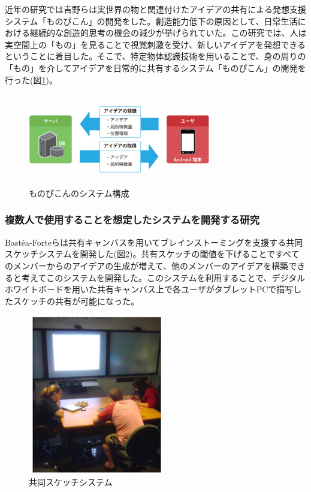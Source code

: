 \documentclass[11pt,a4j, titlepage]{jarticle} %
\begin{document}
近年の研究では吉野ら\cite{yoshino}は実世界の物と関連付けたアイデアの共有による発想支援システム「ものぴこん」の開発をした。創造能力低下の原因として、日常生活における継続的な創造的思考の機会の減少が挙げられていた。この研究では、人は実空間上の「もの」を見ることで視覚刺激を受け、新しいアイデアを発想できるということに着目した。そこで、特定物体認識技術を用いることで、身の周りの「もの」を介してアイデアを日常的に共有するシステム「ものぴこん」の開発を行った(図\ref{fig:monopikon})。

\begin{figure}[H]
  \begin{center}
    \includegraphics[clip,height=4.0cm,width=8.0cm]{./monopikon.eps}
    \caption{ものぴこんのシステム構成}
    \label{fig:monopikon}
  \end{center}
\end{figure}

\subsubsection{複数人で使用することを想定したシステムを開発する研究}
Bast\'ea-Forteら\cite{bastea}は共有キャンバスを用いてブレインストーミングを支援する共同スケッチシステムを開発した(図\ref{fig:collaborative_sketch})。共有スケッチの閾値を下げることですべてのメンバーからのアイデアの生成が増えて、他のメンバーのアイデアを構築できると考えてこのシステムを開発した。このシステムを利用することで、デジタルホワイトボードを用いた共有キャンバス上で各ユーザがタブレットPCで描写したスケッチの共有が可能になった。

\begin{figure}[H]
  \begin{center}
    \includegraphics[clip,height=7.0cm,width=6.0cm]{./collaborative_sketch.eps}
    \caption{共同スケッチシステム}
    \label{fig:collaborative_sketch}
  \end{center}
\end{figure}
\end{document}
